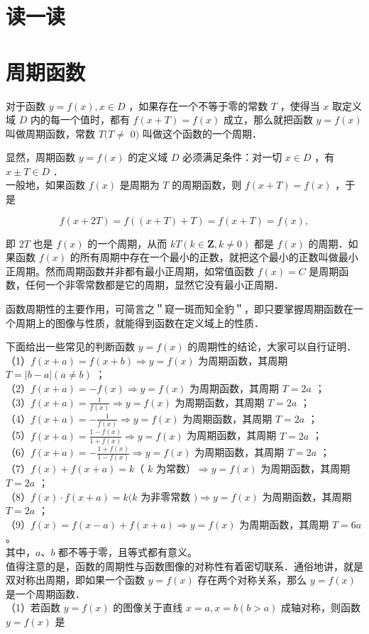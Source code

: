 \documentclass[10pt]{article}
\begin{document}
\section*{读一读}
\section*{周期函数}
对于函数 \(y=f(x), x \in D\) ，如果存在一个不等于零的常数 \(T\) ，使得当 \(x\) 取定义域 \(D\) 内的每一个值时，都有 \(f(x+T)=f(x)\) 成立，那么就把函数 \(y=f(x)\) 叫做周期函数，常数 \(T(T \neq\) \(0)\) 叫做这个函数的一个周期．

显然，周期函数 \(y=f(x)\) 的定义域 \(D\) 必须满足条件：对一切 \(x \in D\) ，有 \(x \pm T \in D\) ．\\
一般地，如果函数 \(f(x)\) 是周期为 \(T\) 的周期函数，则 \(f(x+T)=f(x)\) ，于是

\[
f(x+2 T)=f((x+T)+T)=f(x+T)=f(x),
\]

即 \(2 T\) 也是 \(f(x)\) 的一个周期，从而 \(k T(k \in \mathbf{Z}, k \neq 0)\) 都是 \(f(x)\) 的周期．如果函数 \(f(x)\) 的所有周期中存在一个最小的正数，就把这个最小的正数叫做最小正周期。然而周期函数并非都有最小正周期，如常值函数 \(f(x)=C\) 是周期函数，任何一个非零常数都是它的周期，显然它没有最小正周期．

函数周期性的主要作用，可简言之＂窥一斑而知全豹＂，即只要掌握周期函数在一个周期上的图像与性质，就能得到函数在定义域上的性质．

下面给出一些常见的判断函数 \(y=f(x)\) 的周期性的结论，大家可以自行证明．\\
（1）\(f(x+a)=f(x+b) \Rightarrow y=f(x)\) 为周期函数，其周期 \(T=|b-a|(a \neq b)\) ；\\
（2）\(f(x+a)=-f(x) \Rightarrow y=f(x)\) 为周期函数，其周期 \(T=2 a\) ；\\
（3）\(f(x+a)=\frac{1}{f(x)} \Rightarrow y=f(x)\) 为周期函数，其周期 \(T=2 a\) ；\\
（4）\(f(x+a)=-\frac{1}{f(x)} \Rightarrow y=f(x)\) 为周期函数，其周期 \(T=2 a\) ；\\
（5）\(f(x+a)=\frac{1-f(x)}{1+f(x)} \Rightarrow y=f(x)\) 为周期函数，其周期 \(T=2 a\) ；\\
（6）\(f(x+a)=-\frac{1+f(x)}{1-f(x)} \Rightarrow y=f(x)\) 为周期函数，其周期 \(T=2 a\) ；\\
（7）\(f(x)+f(x+a)=k\)（ \(k\) 为常数）\(\Rightarrow y=f(x)\) 为周期函数，其周期 \(T=2 a\) ；\\
（8）\(f(x) \cdot f(x+a)=k(k\) 为非零常数 \() \Rightarrow y=f(x)\) 为周期函数，其周期 \(T=2 a\) ；\\
（9）\(f(x)=f(x-a)+f(x+a) \Rightarrow y=f(x)\) 为周期函数，其周期 \(T=6 a\) 。\\
其中，\(a 、 b\) 都不等于零，且等式都有意义。\\
值得注意的是，函数的周期性与函数图像的对称性有着密切联系．通俗地讲，就是双对称出周期，即如果一个函数 \(y=f(x)\) 存在两个对称关系，那么 \(y=f(x)\) 是一个周期函数．\\
（1）若函数 \(y=f(x)\) 的图像关于直线 \(x=a, x=b(b>a)\) 成轴对称，则函数 \(y=f(x)\) 是
\end{document}
